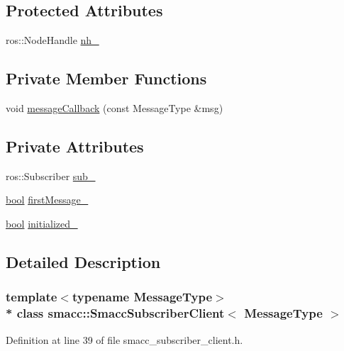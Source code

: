 \subsection*{Protected Attributes}
\begin{DoxyCompactItemize}
\item 
ros\+::\+Node\+Handle \hyperlink{classsmacc_1_1SmaccSubscriberClient_addb62aabc4f81ddac5a151642335ab54}{nh\+\_\+}
\end{DoxyCompactItemize}
\subsection*{Private Member Functions}
\begin{DoxyCompactItemize}
\item 
void \hyperlink{classsmacc_1_1SmaccSubscriberClient_a4102c06930ea8c7ab3d8c5ed9621ce4e}{message\+Callback} (const Message\+Type \&msg)
\end{DoxyCompactItemize}
\subsection*{Private Attributes}
\begin{DoxyCompactItemize}
\item 
ros\+::\+Subscriber \hyperlink{classsmacc_1_1SmaccSubscriberClient_a2a1c46e0ea0a2090a63232402b998518}{sub\+\_\+}
\item 
\hyperlink{classbool}{bool} \hyperlink{classsmacc_1_1SmaccSubscriberClient_ad7af631a0b6bdacb76a2532a06ad0a03}{first\+Message\+\_\+}
\item 
\hyperlink{classbool}{bool} \hyperlink{classsmacc_1_1SmaccSubscriberClient_a429baac945d15cb7d997c41c847f5c33}{initialized\+\_\+}
\end{DoxyCompactItemize}


\subsection{Detailed Description}
\subsubsection*{template$<$typename Message\+Type$>$\\*
class smacc\+::\+Smacc\+Subscriber\+Client$<$ Message\+Type $>$}



Definition at line 39 of file smacc\+\_\+subscriber\+\_\+client.\+h.



